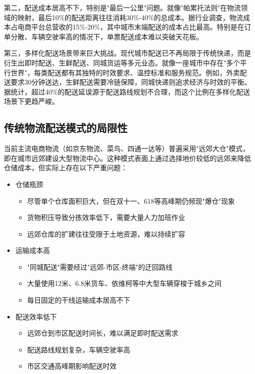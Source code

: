 \documentclass[12pt,a4paper,twoside]{ctexbook}
\begin{document}
第二，配送成本居高不下，特别是"最后一公里"问题。就像"帕累托法则"在物流领域的映射，最后10\%的配送距离往往消耗30\%-40\%的总成本。据行业调查，物流成本占电商平台总营收的15\%-20\%，其中城市末端配送的成本占比最高。特别是在订单分散、车辆空驶率高的情况下，单票配送成本难以突破天花板。

第三，多样化配送场景带来巨大挑战。现代城市配送已不再局限于传统快递，而是衍生出即时配送、生鲜配送、同城货运等多元业态。就像一座城市中存在"多个平行世界"，每类配送都有其独特的时效要求、温控标准和服务规范。例如，外卖配送要求30分钟送达，生鲜配送需要冷链保障，同城快递则追求经济与时效的平衡。据统计，超过40\%的配送延误源于配送路线规划不合理，而这个比例在多样化配送场景下更趋严峻。

\subsection{传统物流配送模式的局限性}
当前主流电商物流（如京东物流、菜鸟、四通一达等）普遍采用"远郊大仓"模式，即在城市远郊建设大型物流中心。这种模式表面上通过选择地价较低的远郊来降低仓储成本，但实际上存在以下严重问题：

\begin{itemize}
\item 仓储瓶颈
    \begin{itemize}
    \item 尽管单个仓库面积巨大，但在双十一、618等高峰期仍频现"爆仓"现象
    \item 货物积压导致分拣效率低下，需要大量人力加班作业
    \item 远郊仓库的扩建往往受限于土地资源，难以持续扩容
    \end{itemize}

\item 运输成本高
    \begin{itemize}
    \item "同城配送"需要经过"远郊-市区-终端"的迂回路线
    \item 大量使用12米、6.8米货车、依维柯等中大型车辆穿梭于城乡之间
    \item 每日固定的干线运输成本居高不下
    \end{itemize}

\item 配送效率低下
    \begin{itemize}
    \item 远郊仓到市区配送时间长，难以满足即时配送需求
    \item 配送路线规划复杂，车辆空驶率高
    \item 市区交通高峰期影响配送时效
    \end{itemize}
\end{itemize}
\end{document}
